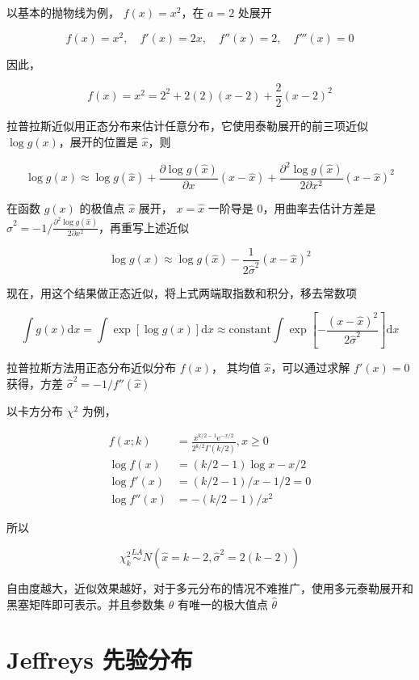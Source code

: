 \documentclass[12pt,a4paper,UTF8,twoside]{book}
\theoremstyle{definition}
\theoremstyle{definition}
\theoremstyle{definition}
\theoremstyle{remark}
\begin{document}
以基本的抛物线为例， \(f(x) = x^2\)，在 \(a = 2\) 处展开

\[ f(x) = x^2, \quad f'(x) = 2x, \quad f''(x) = 2, \quad f'''(x) = 0 \]

因此，

\[ f(x) = x^2 = 2^2 + 2(2)(x-2) + \frac{2}{2}(x-2)^2 \]

拉普拉斯近似用正态分布来估计任意分布，它使用泰勒展开的前三项近似
\(\log g(x)\)，展开的位置是 \(\hat{x}\)，则

\[
\log g(x) \approx \log g(\hat{x}) + \frac{\partial \log g(\hat{x})}{\partial x} (x - \hat{x}) + \frac{\partial^2 \log g(\hat{x})}{2\partial x^2} (x - \hat{x})^2
\]

在函数 \(g(x)\) 的极值点 \(\hat{x}\) 展开， \(x = \hat{x}\) 一阶导是
0，用曲率去估计方差是
\(\hat{\sigma}^2 = -1/\frac{\partial^2 \log g(\hat{x})}{2\partial x^2}\)，再重写上述近似

\[ \log g(x) \approx \log g(\hat{x}) - \frac{1}{2\hat{\sigma}^2} (x - \hat{x})^2 \]

现在，用这个结果做正态近似，将上式两端取指数和积分，移去常数项

\[
\int g(x) \mathrm{d}x = \int \exp[\log g(x)] \mathrm{d}x \approx \mathrm{constant} \int \exp[- \frac{(x - \hat{x})^2}{2\hat{\sigma}^2}] \mathrm{d}x
\]

拉普拉斯方法用正态分布近似分布 \(f(x)\)， 其均值
\(\hat{x}\)，可以通过求解 \(f'(x) = 0\) 获得，方差
\(\hat{\sigma}^2 = -1/f''(\hat{x})\)

以卡方分布 \(\chi^2\) 为例，

\begin{align*}
    f(x; k) & = \frac{ x^{k/2-1} \mathrm{e}^{-x/2} }{ 2^{k/2}\Gamma(k/2) }, x \geq 0 \\
  \log f(x) & = (k/2 - 1) \log x - x/2 \\
 \log f'(x) & = (k/2-1)/x - 1/2 = 0 \\
\log f''(x) & = -(k/2-1)/x^2
\end{align*}

所以

\[ \chi_{k}^2 \overset{LA}{\sim}  N(\hat{x} = k-2, \hat{\sigma}^2 = 2(k-2)) \]

自由度越大，近似效果越好，对于多元分布的情况不难推广，使用多元泰勒展开和黑塞矩阵即可表示。并且参数集
\(\theta\) 有唯一的极大值点 \(\hat{\theta}\) \citep{Tierney1986}

\hypertarget{Jeffreys-prior}{%
\section{Jeffreys 先验分布}\label{Jeffreys-prior}}
\end{document}
